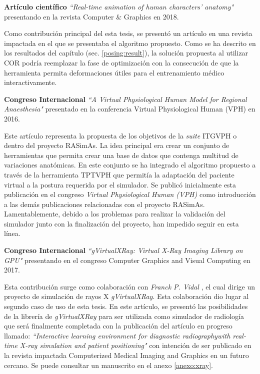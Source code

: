 \textbf{Artículo científico }\emph{``Real-time animation of human characters' anatomy"}\cite{SUJAR2018268} presentando en la revista Computer \& Graphics en 2018. 


Como contribución principal del esta tesis, se presentó un artículo en una revista impactada en el que se presentaba el algoritmo propuesto. Como se ha descrito en los resultados del capítulo (sec. \ref{posing:result}), la solución propuesta al utilizar \ac{COR} podría reemplazar la fase de optimización con la consecución de que la herramienta permita deformaciones útiles para el entrenamiento médico interactivamente.

\textbf{ Congreso Internacional }\emph{``A Virtual Physiological Human Model for Regional Anaesthesia"}\cite{VHZKLBSGSD16} presentado en la conferencia Virtual Physiological Human (VPH) en 2016.

Este artículo representa la propuesta de los objetivos de la \emph{suite} \ac{ITGVPH} o dentro del proyecto \ac{RASimAs}. La idea principal era crear un conjunto de herramientas que permita crear una base de datos que contenga multitud de variaciones anatómicas. En este conjunto se ha integrado el algoritmo propuesto a través de la herramienta \ac{TPTVPH} que permitía la adaptación del paciente virtual a la postura requerida por el simulador. Se publicó inicialmente esta publicación en el congreso \emph{ Virtual Physiological Human (VPH)} como introducción a las demás publicaciones relacionadas con el proyecto \ac{RASimAs}. Lamentablemente, debido a los problemas para realizar la validación del simulador junto con la finalización del proyecto, han  impedido seguir en esta línea. %

\textbf{ Congreso Internacional }\emph{``gVirtualXRay: Virtual X-Ray Imaging Library on GPU"}\cite{sujar:hal} presentando en el congreso Computer Graphics and Visual Computing en 2017.

Esta contribución surge como colaboración con \emph{Franck P. Vidal} \cite{gVirtualXRay}, el cual dirige un proyecto de simulación de rayos X \emph{gVirtualXRay}. Esta colaboración dio lugar al segundo caso de uso de esta tesis. En este artículo, se presentó las posibilidades de la librería de \emph{gVirtualXRay} para ser utilizada como simulador de radiología que será finalmente completada con la publicación del artículo en progreso llamado: \emph{``Interactive learning environment for diagnostic radiographywith real-time X-ray simulation and patient positioning"} con intención de ser publicado en la revista impactada Computerized Medical Imaging and Graphics en un futuro cercano. Se puede consultar un manuscrito en el anexo \ref{anexo:xray}.








